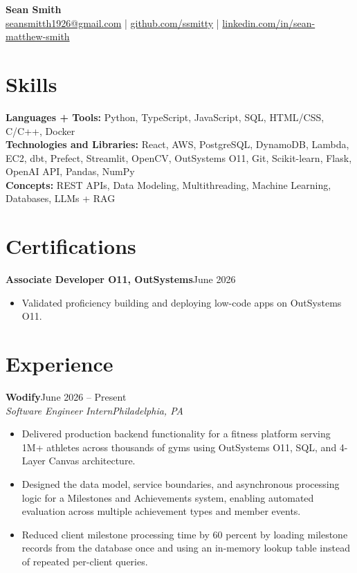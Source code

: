 \documentclass[10.5pt]{article}
\newcommand{\entryline}[2]{%
\vspace{1pt}\textbf{#1}\hfill#2\\
}
\newcommand{\subline}[2]{%
\textit{#1}\hfill\textit{#2}\\[1pt]
}
\begin{document}
\raggedright

\begin{center}
{\LARGE\textbf{Sean Smith}}\\[2pt]
\href{mailto:seansmitth1926@gmail.com}{seansmitth1926@gmail.com}
\;|\;
\href{https://github.com/ssmitty}{github.com/ssmitty}
\;|\;
\href{https://linkedin.com/in/sean-matthew-smith}{linkedin.com/in/sean-matthew-smith}
\end{center}

\vspace{-10pt}

\section*{Skills}
\textbf{Languages + Tools:} Python, TypeScript, JavaScript, SQL, HTML/CSS, C/C++, Docker\\
\textbf{Technologies and Libraries:} React, AWS, PostgreSQL, DynamoDB, Lambda, EC2, dbt, Prefect, Streamlit, OpenCV, OutSystems O11, Git, Scikit-learn, Flask, OpenAI API, Pandas, NumPy\\
\textbf{Concepts:} REST APIs, Data Modeling, Multithreading, Machine Learning, Databases, LLMs + RAG

\section*{Certifications}
\entryline{Associate Developer O11, OutSystems}{June 2026}
\begin{itemize}
\item Validated proficiency building and deploying low-code apps on OutSystems O11.
\end{itemize}

\section*{Experience}

\entryline{Wodify}{June 2026 -- Present}
\subline{Software Engineer Intern}{Philadelphia, PA}
\begin{itemize}
\item Delivered production backend functionality for a fitness platform serving 1M+ athletes across thousands of gyms using OutSystems O11, SQL, and 4-Layer Canvas architecture.
\item Designed the data model, service boundaries, and asynchronous processing logic for a Milestones and Achievements system, enabling automated evaluation across multiple achievement types and member events.
\item Reduced client milestone processing time by 60 percent by loading milestone records from the database once and using an in-memory lookup table instead of repeated per-client queries.
\end{itemize}
\end{document}
